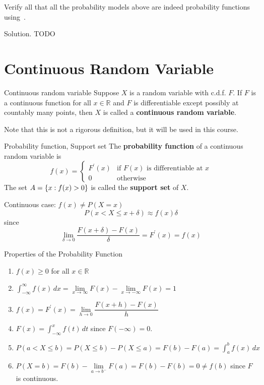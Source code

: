 \begin{Exercise}{}{}
    Verify all that all the probability models above are indeed
    probability functions using~.
\end{Exercise}
Solution. TODO

\section{Continuous Random Variable}
\begin{Definition}{Continuous random variable}{}
    Suppose $ X $ is a random variable with c.d.f. $ F $. If $ F $
    is a continuous function for all $ x\in\mathbb{R} $ and
    $ F $ is differentiable except possibly at
    countably many points, then $ X $ is called a
    \textbf{continuous random variable}.
\end{Definition}
Note that this is not a rigorous definition, but it will be
used in this course.

\begin{Definition}{Probability function, Support set}{}
    The \textbf{probability function} of a continuous random variable
    is
    \[ f(x)=\begin{cases}
            F^\prime(x) & \text{if }F(x)\text{ is differentiable at }x \\
            0           & \text{otherwise}
        \end{cases} \]
    The set $ A=\{x:f(x)>0\} $ is called the \textbf{support set}
    of $ X $.
\end{Definition}

Continuous case: $ f(x)\neq P(X=x) $
\[ P(x<X\leqslant x+\delta)\approx f(x)\delta \]
since
\[ \lim\limits_{{\delta} \to {0}}\frac{F(x+\delta)-F(x)}{\delta}=F^\prime(x)=f(x) \]
\begin{Proposition}{Properties of the Probability Function}{}
    \begin{enumerate}[label=(\arabic*)]
        \item $ f(x)\geqslant 0 $ for all $ x\in\mathbb{R} $
        \item $ \displaystyle \int_{-\infty}^{\infty} f(x)\, d{x} =
                  \lim\limits_{{x} \to {\infty}} F(x)-
                  \lim\limits_{{x} \to {-\infty}} F(x)= 1 $
        \item $ f(x)=F^\prime(x)=
                  \lim\limits_{{h} \to {0}} \dfrac{F(x+h)-F(x)}{h} $
        \item $ F(x)=\displaystyle \int_{-\infty}^{x} f(t)\, d{t} $
              since $ F(-\infty)=0 $.
        \item $ P(a< X\leqslant b)=P(X\leqslant b)-
                  P(X\leqslant a)=F(b)-F(a)
                  =\displaystyle \int_{a}^{b} f(x)\, d{x}  $
        \item $ P(X=b)=F(b)-\lim\limits_{{a} \to {b^-}}
                  F(a)=F(b)-F(b) =0\neq f(b) $ since $ F $ is continuous.
    \end{enumerate}
\end{Proposition}

